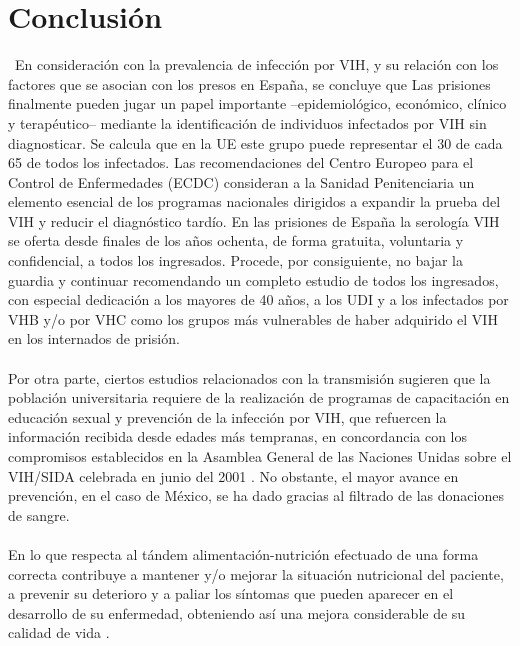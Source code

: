 \documentclass[a4paper,twocolumn,10pt]{article}
\begin{document}
\section{Conclusión}
\ En consideración con la prevalencia de infección por VIH, y su relación con los factores que se asocian con los presos en España, se concluye que Las prisiones finalmente pueden jugar un papel importante –epidemiológico, económico, clínico y  terapéutico– mediante la identificación de individuos infectados por VIH sin diagnosticar. Se calcula que en la UE este grupo puede representar el 30 de cada 65 de todos los infectados. Las recomendaciones del Centro Europeo para el Control de Enfermedades (ECDC) consideran a la Sanidad Penitenciaria un elemento esencial de los programas nacionales dirigidos a expandir la prueba del VIH y reducir el diagnóstico tardío. En las prisiones de España la serología VIH se oferta desde finales de los años ochenta, de forma gratuita, voluntaria y confidencial, a todos los ingresados. Procede, por consiguiente, no bajar la guardia y continuar recomendando un completo estudio de todos los ingresados, con especial dedicación a los mayores de 40 años, a los UDI y a los infectados por
VHB y/o por VHC como los grupos más vulnerables de haber adquirido el VIH en los internados de prisión. \cite{Marco2012}\\ \\
Por otra parte, ciertos estudios relacionados con la transmisión sugieren que la población universitaria requiere de la realización de programas de capacitación en educación sexual y prevención de la infección por VIH, que refuercen la información recibida desde edades más tempranas, en concordancia con los compromisos establecidos en la Asamblea  General de las Naciones Unidas sobre el VIH/SIDA celebrada en junio del 2001 \cite{LinaMariaVera2004}. No obstante, el mayor avance en prevención, en el  caso de México, se ha dado gracias al filtrado de las donaciones de sangre. \\ \\
En lo que respecta al tándem alimentación-nutrición efectuado de una forma correcta contribuye a mantener y/o mejorar la situación nutricional del paciente, a prevenir su deterioro y a paliar los síntomas que pueden aparecer en el desarrollo de su enfermedad, obteniendo así una mejora considerable de su calidad de vida \cite{Herrera2004}.


\end{document}
